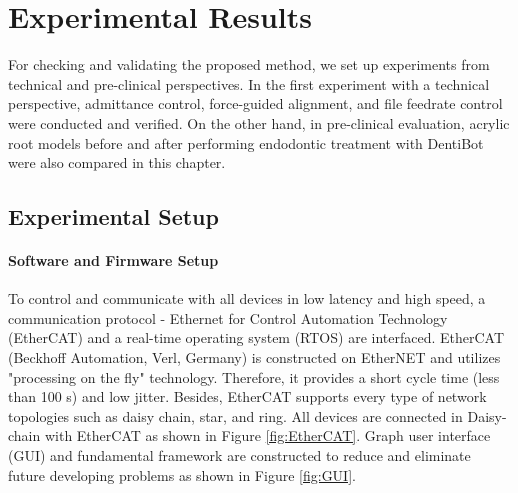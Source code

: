 \chapter{Experimental Results}
\label{chapter6}
\hspace*{6mm}For checking and validating the proposed method, we set up experiments from technical and pre-clinical perspectives. In the first experiment with a technical perspective, admittance control, force-guided alignment, and file feedrate control were conducted and verified. On the other hand, in pre-clinical evaluation, acrylic root models before and after performing endodontic treatment with DentiBot were also compared in this chapter. 
\section{Experimental Setup}
\vspace{-5mm}
\subsubsection{Software and Firmware Setup}
\vspace{-5mm}
\hspace*{6mm}To control and communicate with all devices in low latency and high speed, a communication protocol - Ethernet for Control Automation Technology (EtherCAT) and a real-time operating system (RTOS) are interfaced. EtherCAT (Beckhoff Automation, Verl, Germany) is constructed on EtherNET and utilizes "processing on the fly" technology. Therefore, it provides a short cycle time (less than 100 \textmu s) and low jitter. Besides, EtherCAT supports every type of network topologies such as daisy chain, star, and ring. All devices are connected in Daisy-chain with EtherCAT as shown in Figure \ref{fig:EtherCAT}. Graph user interface (GUI) and fundamental framework are constructed to reduce and eliminate future developing problems as shown in Figure \ref{fig:GUI}.


